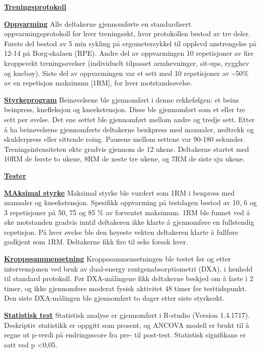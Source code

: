 \documentclass[
]{book}
\begin{document}
\underline{\textbf{Treningsprotokoll}}

\underline{\textbf{Oppvarming}} Alle deltakerne gjennomførte en
standardisert oppvarmingsprotokoll før hver treningsøkt, hvor
protokollen bestod av tre deler. Første del bestod av 5 min sykling på
ergometersykkel til opplevd anstrengelse på 12-14 på Borg-skalaen (RPE).
Andre del av oppvarmingen 10 repetisjoner av fire kroppsvekt
treningsøvelser (individuelt tilpasset armhevninger, sit-ups, rygghev og
knebøy). Siste del av oppvarmingen var et sett med 10 repetisjoner av
\textasciitilde50\% av en repetisjon maksimum {[}1RM{]}, for hver
motstandsøvelse.

\underline{\textbf{Styrkeprogram}} Beinøvelsene ble gjennomført i denne
rekkefølgen: et beins beinpress, knefleksjon og kneekstensjon. Disse ble
gjennomført som et eller tre sett per øvelse. Det ene settet ble
gjennomført mellom andre og tredje sett. Etter å ha beinøvelsene
gjennomførte deltakerne benkpress med manualer, nedtrekk og skulderpress
eller sittende roing. Pausene mellom settene var 90-180 sekunder.
Treningsintensiteten økte gradvis gjennom de 12 ukene. Deltakerne
startet med 10RM de første to ukene, 8RM de neste tre ukene, og 7RM de
siste sju ukene.

\underline{\textbf{Tester}}

\underline{\textbf{MAksimal styrke}} Maksimal styrke ble vurdert som 1RM
i benpress med manualer og kneekstensjon. Spesifikk oppvarming på
testdagen bestod av 10, 6 og 3 repetisjoner på 50, 75 og 85 \% av
forventet maksimum. 1RM ble funnet ved å øke motstanden gradvis inntil
deltakeren ikke klarte å gjennomføre en fullstendig repetisjon. På hver
øvelse ble den høyeste vekten deltakeren klarte å fullføre godkjent som
1RM. Deltakerne fikk fire til seks forsøk hver.

\underline{\textbf{Kroppssammensetning}} Kroppssammensetningen ble
testet før og etter intervensjonen ved bruk av dual-energy
røntgenabsorptiometri (DXA), i henhold til standard protokoll. Før
DXA-målingene fikk deltakerne beskjed om å faste i 2 timer, og ikke
gjennomføre moderat fysisk aktivitet 48 timer før testtidspunkt. Den
siste DXA-målingen ble gjennomført to dager etter siste styrkeøkt.

\underline{\textbf{Statistisk test}} Statistisk analyse er gjennomført i
R-studio (Version 1.4.1717). Deskriptiv statistikk er oppgitt som
prosent, og ANCOVA modell er brukt til å regne ut p-verdi på
endringsscore fra pre- til post-test. Statistisk signifikans er satt ved
p \textless0,05.
\end{document}

